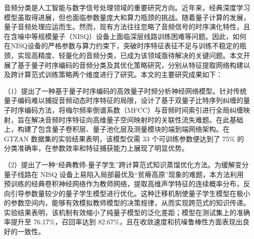 
\begin{abstractcn}\setlength{\baselineskip}{20pt}%
音频分类是人工智能与数字信号处理领域的重要研究方向。近年来，经典深度学习模型虽取得进展，但也面临参数量庞大和算力瓶颈的挑战。随着量子计算的发展，量子音频处理应运而生。然而，现有方法往往忽略了音频信号的时序演化特性，且在含噪中等规模量子（NISQ）设备上面临深层线路训练困难等问题。因此，如何在NISQ设备的严格参数与算力约束下，突破时序特征表征不足与训练不稳定的瓶颈，实现高精度、轻量化的音频分类，已成为该领域亟待解决的关键问题。本文开展了基于量子时序编码的音频分类及其优化策略研究，分别从特征提取网络构建以及跨计算范式训练策略两个维度进行了研究。本文的主要研究成果如下：
	
（1）提出了一种基于量子时序编码的高效量子时频分析神经网络模型。针对传统量子编码难以捕捉音频动态时序特征的局限，设计了基于双量子比特序列纠缠的量子时序编码方法，将梅尔频率倒谱系数（MFCC）与音频时间索引进行全局纠缠映射，旨在解决音频时序特征向高维量子空间映射时的关联性流失难题。在此基础上，构建了包含量子卷积层、量子池化层及测量模块的端到端网络架构。在 GTZAN 数据集的实验结果表明，该模型仅需 33 个可训练参数便达到了 75\% 的分类准确率，在参数效率和特征捕获能力上展现了明显优势。
	
（2）提出了一种“经典教师-量子学生”跨计算范式知识蒸馏优化方法。为缓解变分量子线路在 NISQ 设备上易陷入局部最优及“贫瘠高原”现象的难题，本方法利用预训练的经典卷积神经网络作为教师网络，提取高维声学特征的连续概率分布，反向引导参数量较少的量子学生模型进行优化。这种迁移机制使量子学生模型在极小的参数空间内，能够有效模拟教师模型的决策规律，从而实现跨范式的知识传递。实验结果表明，该机制有效缩小了纯量子模型的泛化差距；模型在测试集上的准确率提升至 76.17\%，召回率达到 82.67\%，且在收敛速度和抗噪鲁棒性方面表现出良好的一致性。
	
\end{abstractcn}

